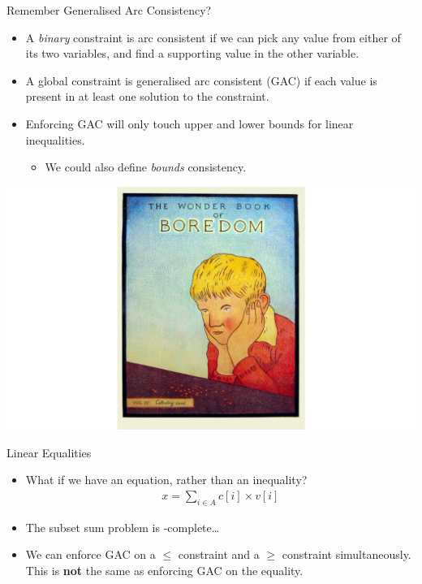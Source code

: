 \documentclass{beamer}
\begin{document}
\begin{frame}{Remember Generalised Arc Consistency?}
    \begin{minipage}{0.6\paperwidth}
    \begin{itemize}
        \item A \emph{binary} constraint is arc consistent if we can pick any value from either of its
            two variables, and find a supporting value in the other variable.
        \item A global constraint is generalised arc consistent (GAC) if each value
            is present in at least one solution to the constraint.
        \item Enforcing GAC will only touch upper and lower bounds for
            linear inequalities.
            \begin{itemize}
                \item We could also define \emph{bounds} consistency.
            \end{itemize}
    \end{itemize}
    \end{minipage}\begin{minipage}{0.4\paperwidth}
        \hspace*{-1cm}\includegraphics[keepaspectratio=true,scale=0.07]{bored.png}
    \end{minipage}
\end{frame}

\begin{frame}{Linear Equalities}
    \begin{itemize}
        \item What if we have an equation, rather than an inequality?
            \begin{align*}x = \sum_{i \in A}{c[i] \times v[i]}\end{align*}
        \item <2-> The subset sum problem is \NP-complete\ldots
        \item <3-> We can enforce GAC on a $\le$ constraint and a $\ge$
            constraint simultaneously. This is \textbf{not} the same as enforcing GAC
            on the equality.
    \end{itemize}
\end{frame}
\end{document}
